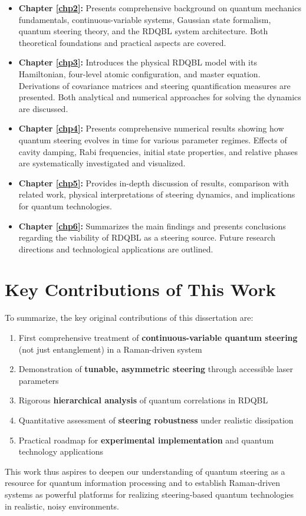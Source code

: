 \begin{itemize}
	\item \textbf{Chapter \ref{chp2}:} Presents comprehensive background on quantum mechanics fundamentals, continuous-variable systems, Gaussian state formalism, quantum steering theory, and the RDQBL system architecture. Both theoretical foundations and practical aspects are covered.

	\item \textbf{Chapter \ref{chp3}:} Introduces the physical RDQBL model with its Hamiltonian, four-level atomic configuration, and master equation. Derivations of covariance matrices and steering quantification measures are presented. Both analytical and numerical approaches for solving the dynamics are discussed.

	\item \textbf{Chapter \ref{chp4}:} Presents comprehensive numerical results showing how quantum steering evolves in time for various parameter regimes. Effects of cavity damping, Rabi frequencies, initial state properties, and relative phases are systematically investigated and visualized.

	\item \textbf{Chapter \ref{chp5}:} Provides in-depth discussion of results, comparison with related work, physical interpretations of steering dynamics, and implications for quantum technologies.

	\item \textbf{Chapter \ref{chp6}:} Summarizes the main findings and presents conclusions regarding the viability of RDQBL as a steering source. Future research directions and technological applications are outlined.
\end{itemize}

\section{Key Contributions of This Work}

To summarize, the key original contributions of this dissertation are:

\begin{enumerate}
	\item First comprehensive treatment of \textbf{continuous-variable quantum steering} (not just entanglement) in a Raman-driven system
	\item Demonstration of \textbf{tunable, asymmetric steering} through accessible laser parameters
	\item Rigorous \textbf{hierarchical analysis} of quantum correlations in RDQBL
	\item Quantitative assessment of \textbf{steering robustness} under realistic dissipation
	\item Practical roadmap for \textbf{experimental implementation} and quantum technology applications
\end{enumerate}

This work thus aspires to deepen our understanding of quantum steering as a resource for quantum information processing and to establish Raman-driven systems as powerful platforms for realizing steering-based quantum technologies in realistic, noisy environments.

